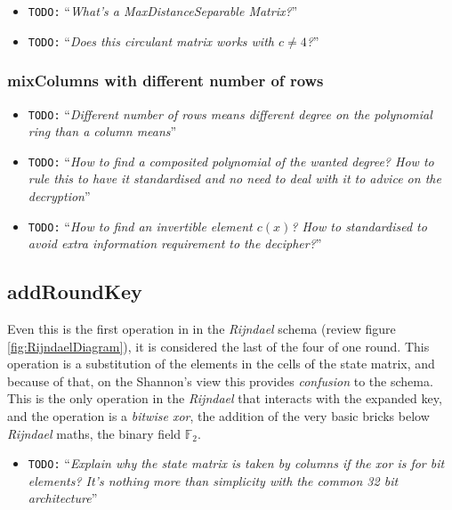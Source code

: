 \documentclass[10pt,a4paper,twoside]{llncs}
\newcommand{\todo}[1]{\texttt{\color{red}TODO:} ``\emph{#1}''}
\newcommand{\Fq}[1]{\ensuremath{\mathbb{F}_#1}}
\begin{document}
\begin{itemize}
 \item \todo{What's a MaxDistanceSeparable Matrix?}
 \item \todo{Does this circulant matrix works with $c\neq 4$?}
\end{itemize}

\subsubsection{mixColumns with different number of rows}

\begin{itemize}
 \item \todo{Different number of rows means different degree on the polynomial ring than a column means}
 \item \todo{How to find a composited polynomial of the wanted degree? How to rule this to have it standardised and no need to deal with it to advice on the decryption}
 \item \todo{How to find an invertible element $c(x)$? How to standardised to avoid extra information requirement to the decipher?}
\end{itemize}

\subsection{addRoundKey}\label{sec:addRoundKey}

Even this is the first operation in in the \emph{Rijndael} schema (review figure \ref{fig:RijndaelDiagram}), it is considered the last of the four of one round. This operation is a substitution of the elements in the cells of the state matrix, and because of that, on the Shannon's view this provides \emph{confusion} to the schema. This is the only operation in the \emph{Rijndael} that interacts with the expanded key, and the operation is a \emph{bitwise xor}, the addition of the very basic bricks below \emph{Rijndael} maths, the binary field $\mathbb{F}_{2}$.

\begin{itemize}
 \item \todo{Explain why the state matrix is taken by columns if the \emph{xor} is for bit elements? It's nothing more than simplicity with the common 32 bit architecture}
\end{itemize}
\end{document}
